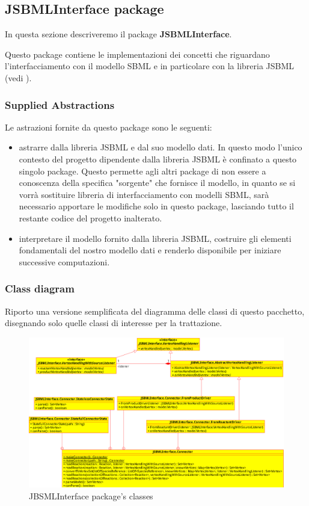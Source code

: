 
\subsection{JSBMLInterface package}

In questa sezione descriveremo il package \textbf{JSBMLInterface}.

Questo package contiene le implementazioni dei concetti che riguardano
l'interfacciamento con il modello SBML e in particolare con la
libreria JSBML (vedi \cite{JSbmlDistribution}). 

\subsubsection*{Supplied Abstractions}

Le astrazioni fornite da questo package sono le seguenti:
\begin{itemize}
\item astrarre dalla libreria JSBML e dal suo modello dati. In questo
  modo l'unico contesto del progetto dipendente dalla libreria JSBML
  \`e confinato a questo singolo package. Questo permette agli altri
  package di non essere a conoscenza della specifica "sorgente" che
  fornisce il modello, in quanto se si vorr\`a sostituire libreria di
  interfacciamento con modelli SBML, sar\`a necessario apportare le
  modifiche solo in questo package, lasciando tutto il restante codice
  del progetto inalterato.
\item interpretare il modello fornito dalla libreria JSBML, costruire
  gli elementi fondamentali del nostro modello dati e renderlo
  disponibile per iniziare successive computazioni.
\end{itemize}

\subsubsection*{Class diagram}

Riporto una versione semplificata del diagramma delle classi di questo
pacchetto, disegnando solo quelle classi di interesse per la
trattazione.
\begin{figure}
  \centering
  \includegraphics[angle=90]{packages/JSBMLInterface-class-diagram.eps}
  \caption{JBSMLInterface package's classes}
  \label{fig:JSBMLInterface-ClassDiagram}
\end{figure}

